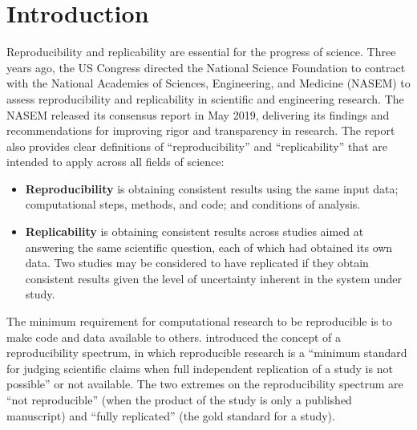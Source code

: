\section{Introduction}

Reproducibility and replicability are essential for the progress of science.
Three years ago, the US Congress directed the National Science Foundation to contract with the National Academies of Sciences, Engineering, and Medicine (NASEM) to assess reproducibility and replicability in scientific and engineering research.
The NASEM released its consensus report\supercite{nasem_2019} in May 2019,  delivering its findings and recommendations for improving rigor and transparency in research.
The report also provides clear definitions of ``reproducibility'' and ``replicability'' that are intended to apply across all fields of science:

\begin{itemize}
  \item[] \textbf{Reproducibility} is obtaining consistent results using the same input data; computational steps, methods, and code; and conditions of analysis.
  \item[] \textbf{Replicability} is obtaining consistent results across studies aimed at answering the same scientific question, each of which had obtained its own data. Two studies may be considered to have replicated if they obtain consistent results given the level of uncertainty inherent in the system under study.
\end{itemize}

The minimum requirement for computational research to be reproducible is to make code and data available to others.
\citet{peng_2011} introduced the concept of a reproducibility spectrum, in which  reproducible research is a ``minimum standard for judging scientific claims when full independent replication of a study is not possible'' or not available.
The two extremes on the reproducibility spectrum are ``not reproducible'' (when the product of the study is only a published manuscript) and ``fully replicated'' (the gold standard for a study).

